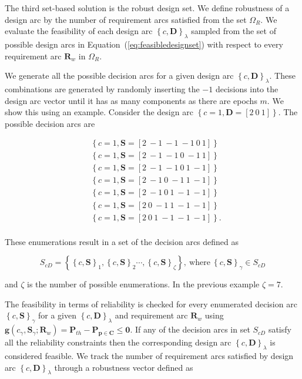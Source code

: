 The third set-based solution is the robust design set. We define robustness of a design arc by the number of requirement arcs satisfied from the set $\Omega_R$. We evaluate the feasibility of each design arc $\left\{c,\mathbf{D}\right\}_\lambda$ sampled from the set of possible design arcs in Equation~(\ref{eq:feasibledesignset}) with respect to every requirement arc $\mathbf{R}_w$ in $\Omega_R$.

We generate all the possible decision arcs for a given design arc $\left\{c,\mathbf{D}\right\}_\lambda$. These combinations are generated by randomly inserting the $-1$ decisions into the design arc vector until it has as many components as there are epochs $m$. We show this using an example. Consider the design arc $\left\{c = 1,\mathbf{D} = \left[2 ~ 0 ~ 1\right]\right\}$. The possible decision arcs are

\begin{equation*}
	\begin{aligned}
		& \left\{c = 1,\mathbf{S} = \left[2 ~ -1 ~ -1 ~ -1 ~ 0 ~ 1\right]\right\}\\
		& \left\{c = 1,\mathbf{S} = \left[2 ~ -1 ~ -1 ~ 0 ~ -1 ~ 1\right]\right\}\\
		& \left\{c = 1,\mathbf{S} = \left[2 ~ -1 ~ -1 ~ 0 ~ 1 ~ -1\right]\right\}\\
		& \left\{c = 1,\mathbf{S} = \left[2 ~ -1 ~ 0 ~ -1 ~ 1 ~ -1\right]\right\}\\
		& \left\{c = 1,\mathbf{S} = \left[2 ~ -1 ~ 0 ~ 1 ~ -1 ~ -1\right]\right\}\\
		& \left\{c = 1,\mathbf{S} = \left[2 ~ 0 ~ -1 ~ 1 ~ -1 ~ -1\right]\right\}\\
		& \left\{c = 1,\mathbf{S} = \left[2 ~ 0 ~ 1 ~ -1 ~ -1 ~ -1\right]\right\}.\\
	\end{aligned}
\end{equation*}

These enumerations result in a set of the decision arcs defined as

\begin{equation} \label{eq:enumeratedcS}
	S_{cD} = \left\{\left\{c,\mathbf{S}\right\}_{1},\left\{c,\mathbf{S}\right\}_{2}\cdots,\left\{c,\mathbf{S}\right\}_{\zeta}\right\},\mathrm{~where~} \left\{c,\mathbf{S}\right\}_{\gamma} \in S_{cD}
\end{equation}

and $\zeta$ is the number of possible enumerations. In the previous example $\zeta = 7$.

The feasibility in terms of reliability is checked for every enumerated decision arc $\left\{c,\mathbf{S}\right\}_{\gamma}$ for a given $\left\{c,\mathbf{D}\right\}_\lambda$ and requirement arc $\mathbf{R}_w$ using $\mathbf{g}(c_{\gamma},\mathbf{S}_{\gamma};\mathbf{R}_w) = \mathbf{P}_{th} - \mathbf{P}_{\mathbf{p} \in \mathbf{C}} \le \mathbf{0}$. If any of the decision arcs in set $S_{cD}$ satisfy all the reliability constraints then the corresponding design arc $\left\{c,\mathbf{D}\right\}_\lambda$ is considered feasible. We track the number of requirement arcs satisfied by design arc $\left\{c,\mathbf{D}\right\}_\lambda$ through a robustness vector defined as

